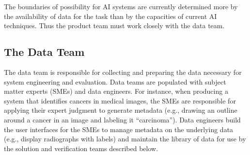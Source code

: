 
The boundaries of possibility for AI systems are currently determined more by the availability of data for the task than by the capacities of current AI techniques. Thus the product team must work closely with the data team.

\subsection{The Data Team}


The data team is responsible for collecting and preparing the data necessary for system engineering and evaluation.
Data teams are populated with subject matter experts (SMEs) and data engineers. For instance, when producing a system that identifies cancers in medical images, the SMEs are responsible for applying their expert judgment to generate metadata (e.g., drawing an outline around a cancer in an image and labeling it ``carcinoma''). Data engineers build the user interfaces for the SMEs to manage metadata on the underlying data (e.g., display radiographs with labels) and maintain the library of data for use by the solution and verification teams described below.

